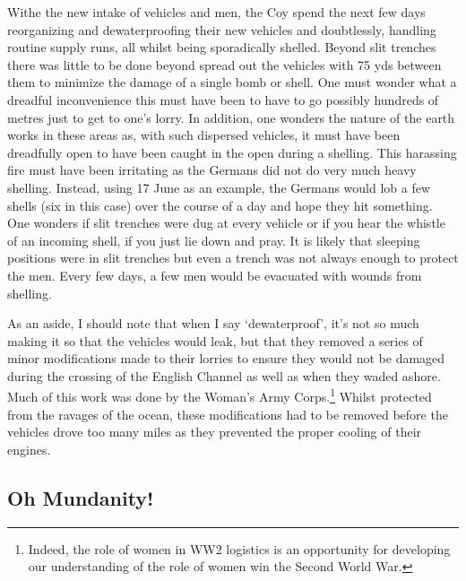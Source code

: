 \documentclass[noraggedright]{turabian-researchpaper}
\begin{document}
Withe the new intake of vehicles and men, the Coy spend the next few days
reorganizing and dewaterproofing their new vehicles and doubtlessly, handling
routine supply runs, all whilst being sporadically shelled.  Beyond slit 
trenches there was little to be done beyond spread out the vehicles with 75 yds
between them to minimize the damage of a single bomb or shell.  One must wonder
what a dreadful inconvenience this must have been to have to go possibly
hundreds of metres just to get to one's lorry.  In addition, one wonders the
nature of the earth works in these areas as, with such dispersed vehicles, it
must have been dreadfully open to have been caught in the open during a 
shelling.  This harassing fire must have been irritating as the Germans did 
not do very much heavy shelling.  Instead, using 17 June as an example, the
Germans would lob a few shells (six in this case) over the course of a day and 
hope they hit something.  One wonders if slit trenches were dug at every vehicle
or if you hear the whistle of an incoming shell, if you just lie down and 
pray.  It is likely that sleeping positions were in slit trenches but even a 
trench was not always enough to protect the men.  Every few days, a few men 
would be evacuated with wounds from shelling.

As an aside, I should 
note that when I say `dewaterproof', it's not so much making it so that the 
vehicles would leak, but that they removed a series of minor modifications 
made to their lorries to ensure they would not be damaged during the crossing 
of the English Channel as well as when they waded ashore.  Much of this work
was done by the Woman's Army Corps.\footnote{Indeed, the role of women in WW2 
logistics is an opportunity for developing our understanding of the role of
women win the Second World War.}   Whilst protected from the ravages of the 
ocean, these modifications had to be removed before the vehicles drove too 
many miles as they prevented the proper cooling of their engines.  




\subsection{Oh Mundanity!}
\end{document}
